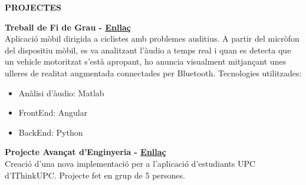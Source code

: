 \documentclass[../main.tex]{subfiles}
\begin{document}
    \textbf{\textcolor{myCV2}{PROJECTES\underline{\hspace{15.55cm}}}}
    \vspace*{0.3cm}
    
    \textbf{Treball de Fi de Grau - 
        \hspace*{0.07cm}
        \textcolor{myCV2}{
        \vspace*{0.1cm}\underline{\href{https://www.youtube.com/watch?v=WKyUsdZbQ0Y}{Enllaç}}}}\\
        Aplicació mòbil dirigida a ciclistes amb problemes auditius. A partir del micròfon del dispositiu mòbil, es va analitzant l'àudio a temps real i quan es detecta que un vehicle motoritzat s'està apropant, ho anuncia visualment mitjançant unes ulleres de realitat augmentada connectades per Bluetooth. Tecnologies utilitzades:
        \begin{itemize}
            \vspace*{-0.2cm}
            \item Anàlisi d'àudio: Matlab
            \vspace*{-0.2cm}
            \item FrontEnd: Angular
            \vspace*{-0.2cm}
            \item BackEnd: Python
        \end {itemize}
        
        \textbf{Projecte Avançat d'Enginyeria - 
         \hspace*{0.07cm}
         \textcolor{myCV2}{
        \vspace*{0.1cm}\underline{\href{https://www.youtube.com/watch?v=RrfiOulhY-E&t=7s}{Enllaç}}}}\\
        Creació d'una nova implementació per a l'aplicació d'estudiants UPC d'IThinkUPC. Projecte fet en grup de 5 persones. 

        
\end{document}

